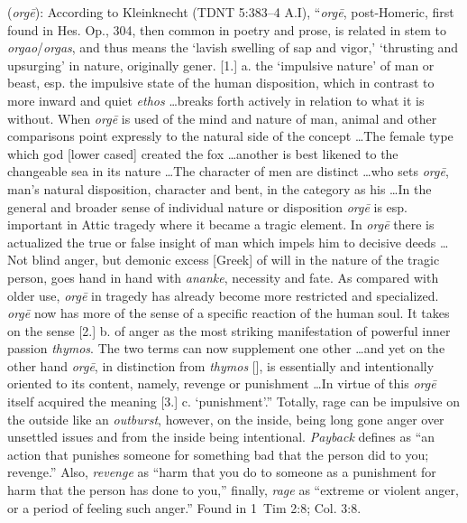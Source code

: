 \item[Rage,]

(\textit{orgē}):
According to Kleinknecht (TDNT 5:383--4 A.I), ``\emph{orgē}, post-Homeric, first found in Hes. Op., 304, then common in poetry and prose, is related in stem to \emph{orgao}/\emph{orgas}, and thus means the `lavish swelling of sap and vigor,' `thrusting and upsurging' in nature, originally gener. [1.] a. the `impulsive nature' of man or beast, esp. the impulsive state of the human disposition, which in contrast to more inward and quiet \emph{ethos} \ldots breaks forth actively in relation to what it is without. When \emph{orgē} is used of the mind and nature of man, animal and other comparisons point expressly to the natural side of the concept \ldots The female type which god [lower cased] created the fox \ldots another is best likened to the changeable sea in its nature \ldots The character of men are distinct \ldots who sets \emph{orgē}, man's natural disposition, character and bent, in the category as his \ldots In the general and broader sense of individual nature or disposition \emph{orgē} is esp. important in Attic tragedy where it became a tragic element. In \emph{orgē} there is actualized the true or false insight of man which impels him to decisive deeds \ldots Not blind anger, but demonic excess [Greek] of will in the nature of the tragic person, goes hand in hand with \emph{ananke}, necessity and fate. As compared with older use, \emph{orgē} in tragedy has already become more restricted and specialized. \emph{orgē} now has more of the sense of a specific reaction of the human soul. It takes on the sense [2.] b. of anger as the most striking manifestation of powerful inner passion \emph{thymos}. The two terms can now supplement one other \ldots and yet on the other hand  \emph{orgē}, in distinction from \emph{thymos} [], is essentially and intentionally oriented to its content, namely, revenge or punishment \ldots In virtue of this \emph{orgē} itself acquired the meaning [3.] c. `punishment'.'' Totally, rage can be impulsive on the outside like an \emph{outburst}, however, on the inside, being long gone anger over unsettled issues and from the inside being intentional. \emph{Payback} defines as ``an action that punishes someone for something bad that the person did to you; revenge.'' Also, \emph{revenge} as ``harm that you do to someone as a punishment for harm that the person has done to you,'' finally, \emph{rage} as ``extreme or violent anger, or a period of feeling such anger.''
Found in 1~Tim 2:8; Col. 3:8.
